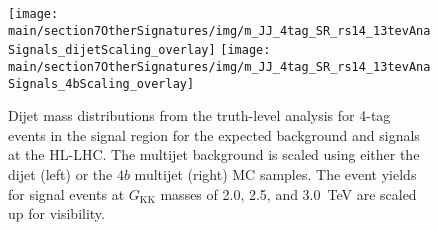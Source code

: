 \begin{figure}[t!]
\begin{center}
\texttt{[image: \\main/section7OtherSignatures/img/m\_JJ\_4tag\_SR\_rs14\_13tevAnaSignals\_dijetScaling\_overlay]}
\texttt{[image: \\main/section7OtherSignatures/img/m\_JJ\_4tag\_SR\_rs14\_13tevAnaSignals\_4bScaling\_overlay]}
\caption{Dijet mass distributions from the truth-level analysis for 4-tag events in the signal region
 for the expected background and signals at the HL-LHC. The multijet background is scaled using
 either the dijet (left) or the $4b$ multijet (right) MC samples. The event yields for signal events
 at $G_\mathrm{KK}$ masses of 2.0, 2.5, and 3.0~TeV are scaled up for visibility.}
\label{fig:mJJ_SR_14TeV_HHatlas}
\end{center}
\end{figure}


